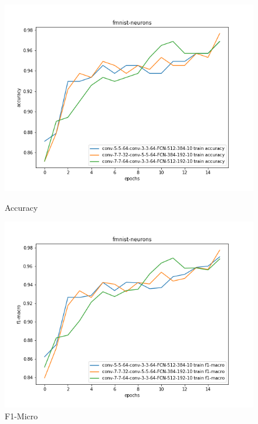 \documentclass{article}
\begin{document}
\begin{figure}[!htb]
	\includegraphics[width=\linewidth]{../output_plots/FMNIST/task-2/fmnist-neurons-Accuracy-accuracy.png}
	\caption{Accuracy}\label{fig:part_1_task_2_accuracy}
	\endminipage\hfill
	\includegraphics[width=\linewidth]{../output_plots/FMNIST/task-2/fmnist-neurons-F1-macro-score-f1-macro.png}
	\caption{F1-Micro}\label{fig:part_1_task_2_f1-micro}
	\endminipage

\end{figure}
\end{document}
